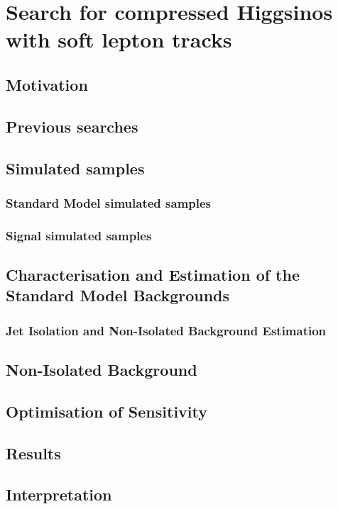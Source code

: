 \chapter{Search for compressed Higgsinos  with soft
lepton tracks}

\section{Motivation}

\section{Previous searches}




\section{Simulated samples}
\subsection{Standard Model simulated samples}
\label{sec:sm-mc}
\subsection{Signal simulated samples}
\label{signal-simulation}








\clearpage
\section{Characterisation and Estimation of the Standard Model Backgrounds}

\subsection{Jet Isolation and Non-Isolated Background Estimation}
\label{jetty-background-estimation}

\section{Non-Isolated Background}

\section{Optimisation of Sensitivity}

\section{Results}

\section{Interpretation}
